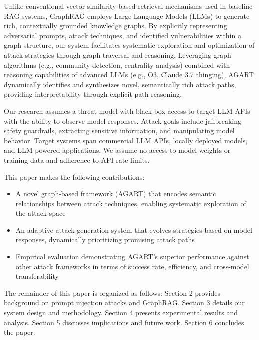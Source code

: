Unlike conventional vector similarity-based retrieval mechanisms used in baseline RAG systems, GraphRAG employs Large Language Models (LLMs) to generate rich, contextually grounded knowledge graphs. By explicitly representing adversarial prompts, attack techniques, and identified vulnerabilities within a graph structure, our system facilitates systematic exploration and optimization of attack strategies through graph traversal and reasoning. Leveraging graph algorithms (e.g., community detection, centrality analysis) combined with reasoning capabilities of advanced LLMs (e.g., O3, Claude 3.7 thinging), AGART dynamically identifies and synthesizes novel, semantically rich attack paths, providing interpretability through explicit path reasoning.

Our research assumes a threat model with black-box access to target LLM APIs with the ability to observe model responses. Attack goals include jailbreaking safety guardrails, extracting sensitive information, and manipulating model behavior. Target systems span commercial LLM APIs, locally deployed models, and LLM-powered applications. We assume no access to model weights or training data and adherence to API rate limits.

This paper makes the following contributions:
\begin{itemize}
\item A novel graph-based framework (AGART) that encodes semantic relationships between attack techniques, enabling systematic exploration of the attack space
\item An adaptive attack generation system that evolves strategies based on model responses, dynamically prioritizing promising attack paths
\item Empirical evaluation demonstrating AGART's superior performance against other attack frameworks in terms of success rate, efficiency, and cross-model transferability
\end{itemize}

The remainder of this paper is organized as follows: Section 2 provides background on prompt injection attacks and GraphRAG. Section 3 details our system design and methodology. Section 4 presents experimental results and analysis. Section 5 discusses implications and future work. Section 6 concludes the paper. 